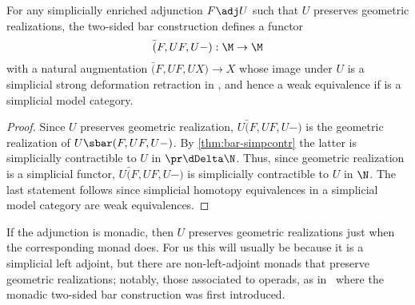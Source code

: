 \begin{cor}\label{thm:bar-repl}
  For any simplicially enriched adjunction $F\adj U$ such that $U$ preserves geometric realizations, the two-sided bar construction defines a functor
  \[ \bar(F,UF,U-) : \M \to \M \]
  with a natural augmentation $\bar(F,UF,UX)\to X$ whose image under $U$ is a simplicial strong deformation retraction in \N, and hence a weak equivalence if \N is a simplicial model category.
\end{cor}
\begin{proof}
  Since $U$ preserves geometric realization, $U\bar(F,UF,U-)$ is the geometric realization of $U\sbar(F,UF,U-)$.
  By \cref{thm:bar-simpcontr} the latter is simplicially contractible to $U$ in $\pr\dDelta\N$.
  Thus, since geometric realization is a simplicial functor, $U\bar(F,UF,U-)$ is simplicially contractible to $U$ in $\N$.
  The last statement follows since simplicial homotopy equivalences in a simplicial model category are weak equivalences.
\end{proof}

\begin{rmk}
  If the adjunction is monadic, then $U$ preserves geometric realizations just when the corresponding monad does.
  For us this will usually be because it is a simplicial left adjoint, but there are non-left-adjoint monads that preserve geometric realizations; notably, those associated to operads, as in~\cite[Theorem 12.2]{may:goils} where the monadic two-sided bar construction was first introduced.
\end{rmk}

